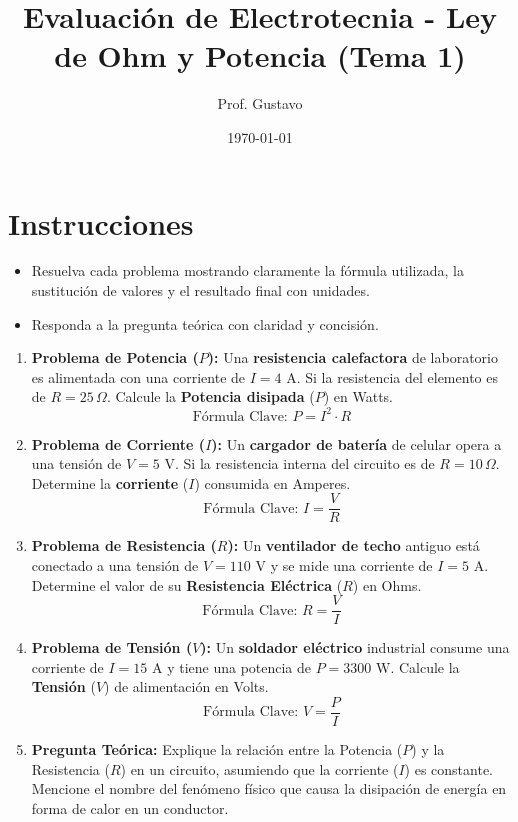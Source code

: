 \documentclass{article}
\title{Evaluación de Electrotecnia - Ley de Ohm y Potencia (Tema 1)}
\author{Prof. Gustavo}
\date{\today}
\begin{document}
\maketitle

\section*{Instrucciones}

\begin{itemize}
    \item Resuelva cada problema mostrando claramente la fórmula utilizada, la sustitución de valores y el resultado final con unidades.
    \item Responda a la pregunta teórica con claridad y concisión.
\end{itemize}

\begin{enumerate}
    \item \textbf{Problema de Potencia ($P$):}
    Una \textbf{resistencia calefactora} de laboratorio es alimentada con una corriente de $I = 4 \text{ A}$. Si la resistencia del elemento es de $R = 25 \, \Omega$. Calcule la \textbf{Potencia disipada} ($P$) en Watts.
    \[ \text{Fórmula Clave: } P = I^2 \cdot R \]
    
    \item \textbf{Problema de Corriente ($I$):}
    Un \textbf{cargador de batería} de celular opera a una tensión de $V = 5 \text{ V}$. Si la resistencia interna del circuito es de $R = 10 \, \Omega$. Determine la \textbf{corriente} ($I$) consumida en Amperes.
    \[ \text{Fórmula Clave: } I = \frac{V}{R} \]
    
    \item \textbf{Problema de Resistencia ($R$):}
    Un \textbf{ventilador de techo} antiguo está conectado a una tensión de $V = 110 \text{ V}$ y se mide una corriente de $I = 5 \text{ A}$. Determine el valor de su \textbf{Resistencia Eléctrica} ($R$) en Ohms.
    \[ \text{Fórmula Clave: } R = \frac{V}{I} \]
    
    \item \textbf{Problema de Tensión ($V$):}
    Un \textbf{soldador eléctrico} industrial consume una corriente de $I = 15 \text{ A}$ y tiene una potencia de $P = 3300 \text{ W}$. Calcule la \textbf{Tensión} ($V$) de alimentación en Volts.
    \[ \text{Fórmula Clave: } V = \frac{P}{I} \]
    
    \item \textbf{Pregunta Teórica:}
    Explique la relación entre la Potencia ($P$) y la Resistencia ($R$) en un circuito, asumiendo que la corriente ($I$) es constante. Mencione el nombre del fenómeno físico que causa la disipación de energía en forma de calor en un conductor.
\end{enumerate}
\end{document}
